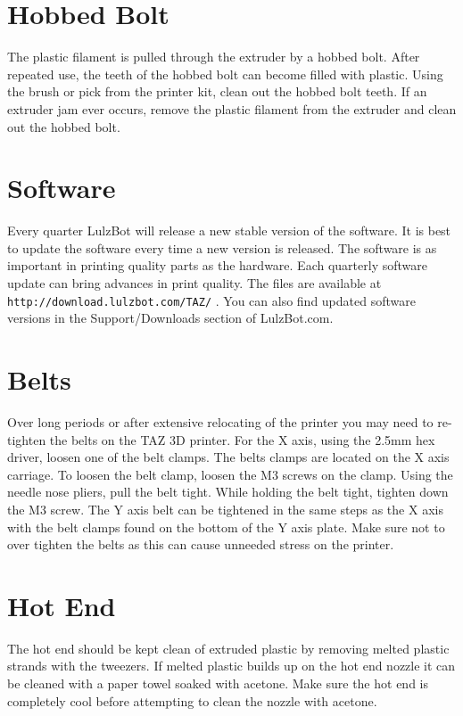 \section{Hobbed Bolt}
The plastic filament is pulled through the extruder by a hobbed bolt. After repeated use, the teeth of the hobbed bolt can become filled with plastic. Using the brush or pick from the printer kit, clean out the hobbed bolt teeth. If an extruder jam ever occurs, remove the plastic filament from the extruder and clean out the hobbed bolt.

\section{Software}
Every quarter LulzBot will release a new stable version of the software. It is best to update the software every time a new version is released. The software is as important in printing quality parts as the hardware. Each quarterly software update can bring advances in print quality. The files are available at \texttt{http://download.lulzbot.com/TAZ/} . You can also find updated software versions in the Support/Downloads section of LulzBot.com.

\section{Belts}
Over long periods or after extensive relocating of the printer you may need to re-tighten the belts on the TAZ 3D printer. For the X axis, using the 2.5mm hex driver, loosen one of the belt clamps. The belts clamps are located on the X axis carriage. To loosen the belt clamp, loosen the M3 screws on the clamp. Using the needle nose pliers, pull the belt tight. While holding the belt tight, tighten down the M3 screw. The Y axis belt can be tightened in the same steps as the X axis with the belt clamps found on the bottom of the Y axis plate. Make sure not to over tighten the belts as this can cause unneeded stress on the printer.

\section{Hot End}
The hot end should be kept clean of extruded plastic by removing melted plastic strands with the tweezers. If melted plastic builds up on the hot end nozzle it can be cleaned with a paper towel soaked with acetone. Make sure the hot end is completely cool before attempting to clean the nozzle with acetone.


